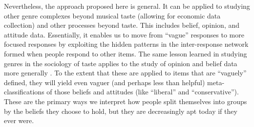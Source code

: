 \documentclass[a4paper,12pt]{article}
\begin{document}
Nevertheless, the approach proposed here is general. It can be applied to studying other genre complexes beyond musical taste (allowing for economic data collection) and other processes beyond taste. This includes belief, opinion, and attitude data. Essentially, it enables us to move from ``vague'' responses to more focused responses by exploiting the hidden patterns in the inter-response network formed when people respond to other items. The same lesson learned in studying genres in the sociology of taste applies to the study of opinion and belief data more generally \citep{boutyline2017belief}. To the extent that these are applied to items that are ``vaguely'' defined, they will yield even vaguer (and perhaps less than helpful) meta-classifications of those beliefs and attitudes (like ``liberal'' and ``conservative''). These are the primary ways we interpret how people split themselves into groups by the beliefs they choose to hold, but they are decreasingly apt today if they ever were. 
 


\end{document}
